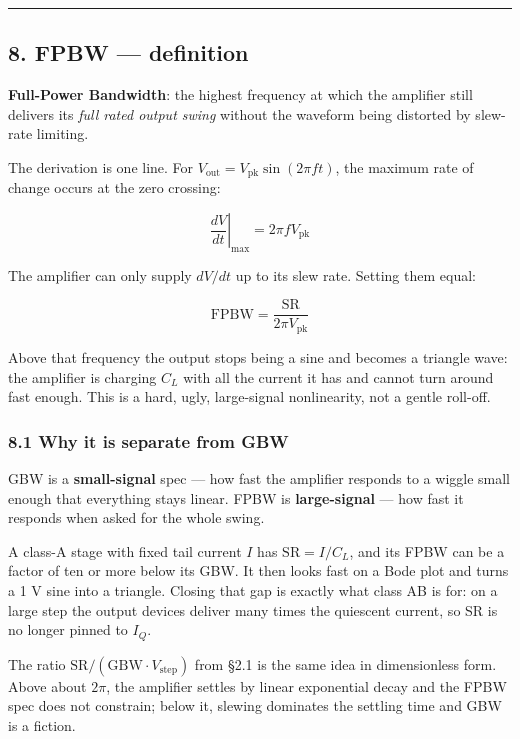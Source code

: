 \documentclass[
  10pt,
  a4paper,
]{article}
\begin{document}
\begin{center}\rule{0.5\linewidth}{0.5pt}\end{center}

\hypertarget{fpbw-definition}{%
\subsection{8. FPBW --- definition}\label{fpbw-definition}}

\textbf{Full-Power Bandwidth}: the highest frequency at which the
amplifier still delivers its \emph{full rated output swing} without the
waveform being distorted by slew-rate limiting.

The derivation is one line. For
\(V_\mathrm{out} = V_\mathrm{pk}\sin(2\pi f t)\), the maximum rate of
change occurs at the zero crossing:

\[\left.\frac{dV}{dt}\right|_\mathrm{max} = 2\pi f V_\mathrm{pk}\]

The amplifier can only supply \(dV/dt\) up to its slew rate. Setting
them equal:

\[\boxed{\ \mathrm{FPBW} = \frac{\mathrm{SR}}{2\pi V_\mathrm{pk}}\ }\]

Above that frequency the output stops being a sine and becomes a
triangle wave: the amplifier is charging \(C_L\) with all the current it
has and cannot turn around fast enough. This is a hard, ugly,
large-signal nonlinearity, not a gentle roll-off.

\hypertarget{why-it-is-separate-from-gbw}{%
\subsubsection{8.1 Why it is separate from
GBW}\label{why-it-is-separate-from-gbw}}

GBW is a \textbf{small-signal} spec --- how fast the amplifier responds
to a wiggle small enough that everything stays linear. FPBW is
\textbf{large-signal} --- how fast it responds when asked for the whole
swing.

A class-A stage with fixed tail current \(I\) has
\(\mathrm{SR} = I/C_L\), and its FPBW can be a factor of ten or more
below its GBW. It then looks fast on a Bode plot and turns a 1 V sine
into a triangle. Closing that gap is exactly what class AB is for: on a
large step the output devices deliver many times the quiescent current,
so SR is no longer pinned to \(I_Q\).

The ratio \(\mathrm{SR}/(\mathrm{GBW}\cdot V_\mathrm{step})\) from §2.1
is the same idea in dimensionless form. Above about \(2\pi\), the
amplifier settles by linear exponential decay and the FPBW spec does not
constrain; below it, slewing dominates the settling time and GBW is a
fiction.
\end{document}
